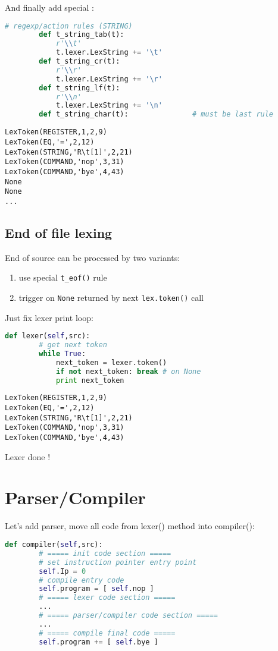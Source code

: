 And finally add special :
\begin{lstlisting}[language=python]
		# regexp/action rules (STRING)
		def t_string_tab(t):
			r'\\t'
			t.lexer.LexString += '\t'
		def t_string_cr(t):
			r'\\r'
			t.lexer.LexString += '\r'
		def t_string_lf(t):
			r'\\n'
			t.lexer.LexString += '\n'
		def t_string_char(t):				# must be last rule
\end{lstlisting}
\begin{lstlisting}
LexToken(REGISTER,1,2,9)
LexToken(EQ,'=',2,12)
LexToken(STRING,'R\t[1]',2,21)
LexToken(COMMAND,'nop',3,31)
LexToken(COMMAND,'bye',4,43)
None
None
...
\end{lstlisting}

\subsection{End of file lexing}

End of source can be processed by two variants:
\begin{enumerate}[nosep]
  \item use special \verb|t_eof()| rule
  \item trigger on \verb|None| returned by next \verb|lex.token()| call 
\end{enumerate}

Just fix lexer print loop:
\begin{lstlisting}[language=python]
	def lexer(self,src):
		# get next token						 
		while True:
			next_token = lexer.token()
			if not next_token: break # on None
			print next_token
\end{lstlisting}
\begin{lstlisting}
LexToken(REGISTER,1,2,9)
LexToken(EQ,'=',2,12)
LexToken(STRING,'R\t[1]',2,21)
LexToken(COMMAND,'nop',3,31)
LexToken(COMMAND,'bye',4,43)
\end{lstlisting}

\begin{center}{\Huge Lexer done !}\end{center}

\section{Parser/Compiler}

Let's add parser, move all code from lexer() method into compiler():
\begin{lstlisting}[language=python]
	def compiler(self,src):
		# ===== init code section =====
		# set instruction pointer entry point
		self.Ip = 0							
		# compile entry code	
		self.program = [ self.nop ]
		# ===== lexer code section =====
		...
		# ===== parser/compiler code section =====
		...
		# ===== compile final code =====
		self.program += [ self.bye ]
\end{lstlisting}

